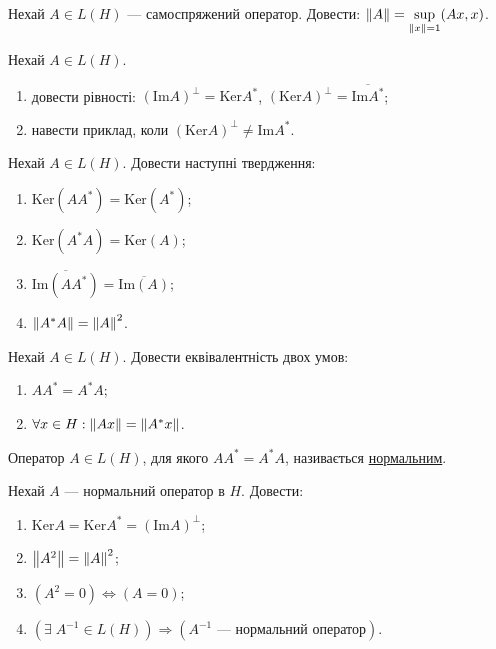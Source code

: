 
\begin{exercise}
    Нехай $A \in L(H)$ --- самоспряжений оператор.
    Довести: $\left\lVert A\right\rVert = \underset{\left\lVert x\right\rVert = 1}{\sup}(Ax, x)$.
\end{exercise}

\begin{exercise}
    Нехай $A \in L(H)$.
    \begin{enumerate}[label=\ukr*)]
        \item довести рівності: $(\mathrm{Im}A)^\perp = \mathrm{Ker}A^*$, $(\mathrm{Ker}A)^\perp = \overline{\mathrm{Im}A^*}$;
        \item навести приклад, коли $(\mathrm{Ker}A)^\perp \neq \mathrm{Im}A^*$.
    \end{enumerate}
\end{exercise}

\begin{exercise}\label{N:1_3_12}
    Нехай $A \in L(H)$. Довести наступні твердження:
    \begin{enumerate}[label=\ukr*)]
        \item $\mathrm{Ker}(A A^*) = \mathrm{Ker}(A^*)$;
        \item $\mathrm{Ker}(A^* A) = \mathrm{Ker}(A)$;
        \item $\overline{\mathrm{Im} (A A^*)} = \overline{\mathrm{Im} (A)}$;
        \item\label{N:1_3_12_h} $\left\lVert A^* A\right\rVert = \left\lVert A\right\rVert^2$.
    \end{enumerate}
\end{exercise}

\begin{exercise}
    Нехай $A \in L(H)$. Довести еквівалентність двох умов:
    \begin{enumerate}[label=\ukr*)]
        \item $A A^* = A^* A$;
        \item $\forall x \in H : \left\lVert Ax\right\rVert = \left\lVert A^{*}x\right\rVert$.
    \end{enumerate}
\end{exercise}

\begin{theory}
    Оператор $A \in L(H)$, для якого $A A^* = A^* A$, називається \uline{нормальним}.
\end{theory}

\begin{exercise}\label{N:1_3_14}
    Нехай $A$ --- нормальний оператор в $H$. Довести:
    \begin{enumerate}[label=\ukr*)]
        \item $\mathrm{Ker} A = \mathrm{Ker} A^* = (\mathrm{Im} A)^\perp$;
        \item $\left\lVert A^2\right\rVert = \left\lVert A\right\rVert^2$;
        \item $(A^2 = 0) \Leftrightarrow (A = 0)$;
        \item $\left( \exists \; A^{-1} \in L(H)\right) \Rightarrow (A^{-1} \text{ --- нормальний оператор})$.
    \end{enumerate}
\end{exercise}

